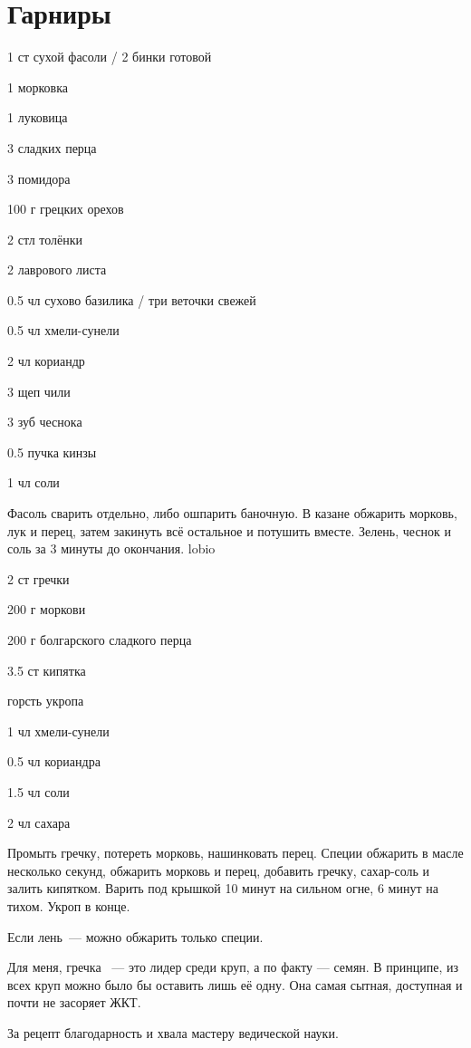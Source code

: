 \chapter*{Гарниры}
\label{sec:garnish}



{
\item 1 ст сухой  фасоли / 2 бинки готовой
\item 1 морковка 
\item 1 луковица
\item 3 сладких перца
\item 3 помидора
\item 100 г грецких орехов 
\item 2 стл толёнки 
}{
\item 2 лаврового листа
\item 0.5 чл сухово базилика / три веточки свежей
\item 0.5 чл хмели-сунели
\item 2 чл кориандр
\item 3 щеп чили 
\item 3 зуб чеснока 
\item 0.5 пучка кинзы
\item 1 чл соли
}{
Фасоль сварить отдельно, либо ошпарить баночную. В казане обжарить морковь, лук и перец, затем закинуть всё остальное и потушить вместе. Зелень, чеснок и соль за 3 минуты до окончания.
}{}{lobio}

{
\item 2 ст гречки
\item 200 г моркови
\item 200 г болгарского сладкого перца
\item 3.5 ст кипятка
\item горсть укропа
}{
\item 1 чл хмели-сунели
\item 0.5 чл кориандра
\item 1.5 чл соли
\item 2 чл сахара
}{
Промыть гречку, потереть морковь, нашинковать перец. Специи обжарить в масле несколько секунд, обжарить морковь и перец, добавить гречку, сахар-соль и залить кипятком. Варить под крышкой 10 минут на сильном огне, 6 минут на тихом. Укроп в конце.
}{
\begin{advice}
\item Если лень~--- можно обжарить только специи.
\item Для меня, гречка ~--- это лидер среди круп, а по факту — семян. В принципе, из всех круп можно было бы оставить лишь её одну. Она самая сытная, доступная и почти не засоряет ЖКТ. 
\item За рецепт благодарность и хвала мастеру ведической науки. 
\end{advice}}{}



